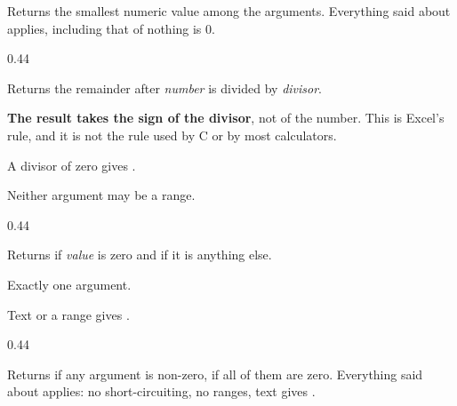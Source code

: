 Returns the smallest numeric value among the arguments. Everything said about
 applies, including that  of nothing is 0.

\begin{ccexamples}{0.44\linewidth}
\end{ccexamples}


Returns the remainder after \emph{number} is divided by \emph{divisor}.

\begin{ccsteps}
\item \textbf{The result takes the sign of the divisor}, not of the number.
This is Excel's rule, and it is not the rule used by C or by most calculators.
\item A divisor of zero gives .
\item Neither argument may be a range.
\end{ccsteps}

\begin{ccexamples}{0.44\linewidth}
\end{ccexamples}


Returns  if \emph{value} is zero and  if it is anything
else.

\begin{ccsteps}
\item Exactly one argument.
\item Text or a range gives .
\end{ccsteps}

\begin{ccexamples}{0.44\linewidth}
\end{ccexamples}


Returns  if any argument is non-zero,  if all of them are
zero. Everything said about  applies: no short-circuiting, no ranges,
text gives .


